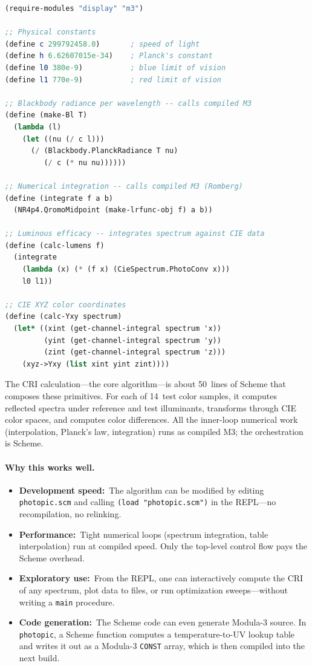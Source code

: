 \documentclass[12pt]{report}
\begin{document}
\begin{lstlisting}[language=Scheme]
(require-modules "display" "m3")

;; Physical constants
(define c 299792458.0)       ; speed of light
(define h 6.62607015e-34)    ; Planck's constant
(define l0 380e-9)           ; blue limit of vision
(define l1 770e-9)           ; red limit of vision

;; Blackbody radiance per wavelength -- calls compiled M3
(define (make-Bl T)
  (lambda (l)
    (let ((nu (/ c l)))
      (/ (Blackbody.PlanckRadiance T nu)
         (/ c (* nu nu))))))

;; Numerical integration -- calls compiled M3 (Romberg)
(define (integrate f a b)
  (NR4p4.QromoMidpoint (make-lrfunc-obj f) a b))

;; Luminous efficacy -- integrates spectrum against CIE data
(define (calc-lumens f)
  (integrate
    (lambda (x) (* (f x) (CieSpectrum.PhotoConv x)))
    l0 l1))

;; CIE XYZ color coordinates
(define (calc-Yxy spectrum)
  (let* ((xint (get-channel-integral spectrum 'x))
         (yint (get-channel-integral spectrum 'y))
         (zint (get-channel-integral spectrum 'z)))
    (xyz->Yxy (list xint yint zint))))
\end{lstlisting}

\noindent The CRI calculation---the core algorithm---is about
50~lines of Scheme that composes these primitives.  For each of
14~test color samples, it computes reflected spectra under reference
and test illuminants, transforms through CIE color spaces, and
computes color differences.  All the inner-loop numerical work
(interpolation, Planck's law, integration) runs as compiled M3; the
orchestration is Scheme.

\paragraph{Why this works well.}
\begin{itemize}
\item \textbf{Development speed:}\  The algorithm can be modified by
  editing {\tt photopic.scm} and calling {\tt (load "photopic.scm")}
  in the REPL---no recompilation, no relinking.
\item \textbf{Performance:}\  Tight numerical loops (spectrum
  integration, table interpolation) run at compiled speed.
  Only the top-level control flow pays the Scheme overhead.
\item \textbf{Exploratory use:}\  From the REPL, one can
  interactively compute the CRI of any spectrum, plot data to files,
  or run optimization sweeps---without writing a {\tt main} procedure.
\item \textbf{Code generation:}\  The Scheme code can even generate
  Modula-3 source.  In {\tt photopic}, a Scheme function computes
  a temperature-to-UV lookup table and writes it out as a Modula-3
  {\tt CONST} array, which is then compiled into the next build.
\end{itemize}
\end{document}
